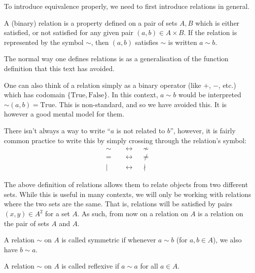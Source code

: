 To introduce equivalence properly, we need to first introduce relations in general.
\begin{definition}[Relations]
    A (binary) relation is a property defined on a pair of sets $A, B$ which is either satisfied, or not satisfied for any given pair $(a,b) \in A \times B$.
    If the relation is represented by the symbol $\sim$, then $(a, b)$ satisfies $\sim$ is written $a \sim b$.
\end{definition}
\begin{remark}
    The normal way one defines relations is as a generalisation of the function definition that this text has avoided.
    
    One can also think of a relation simply as a binary operator (like $+$, $-$, etc.) which has codomain $\{\text{True}, \text{False}\}$. 
    In this context, $a \sim b$ would be interpreted $\sim(a,b) = \text{True}$. This is non-standard, and so we have avoided this. It is however a good mental model for them.
\end{remark}
\begin{remark}
    There isn't always a way to write ``$a$ is not related to $b$'', however, it is fairly common practice to write this by simply crossing through the relation's symbol:
    \begin{align*}
        \sim \quad &\longleftrightarrow \quad \not\sim \\
        = \quad &\longleftrightarrow \quad \ne \\
        \mid \quad &\longleftrightarrow \quad \nmid
    \end{align*}
\end{remark}
\begin{remark}
    The above definition of relations allows them to relate objects from two different sets. While this is useful in many contexts, we will only be working with relations where the two sets are the same.
    That is, relations will be satisfied by pairs $(x,y) \in A^2$ for a set $A$. As such, from now on a relation on $A$ is a relation on the pair of sets $A$ and $A$.
\end{remark}
\begin{definition}[Symmetry]
    A relation $\sim$ on $A$ is called symmetric if whenever $a \sim b$ (for $a,b\in A$), we also have $b \sim a$.
\end{definition}
\begin{definition}[Reflexivity]
    A relation $\sim$ on $A$ is called reflexive if $a \sim a$ for all $a\in A$.
\end{definition}
